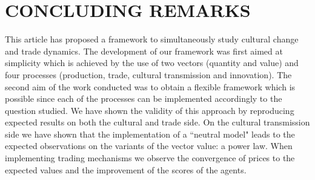 \documentclass{wscpaperproc}
\newcommand{\memo}[2]{\textcolor{#1}{#2}}
\newcommand{\simon}[1]{\memo{green}{Simon: #1\\}}
\begin{document}
%
%

\section{CONCLUDING REMARKS}

This article has proposed a framework to simultaneously study cultural change and trade dynamics. The development of our framework was first aimed at simplicity which is achieved by the use of two vectors (quantity and value) and four processes (production, trade, cultural transmission and innovation). The second aim of the work conducted was to obtain a flexible framework which is possible since each of the processes can be implemented accordingly to the question studied. We have shown the validity of this approach by reproducing expected results on both the cultural and trade side. On the cultural transmission side we have shown that the implementation of a ``neutral model" leads to the expected observations on the variants of the vector value: a power law. When implementing trading mechanisms we observe the convergence of prices to the expected values and the improvement of the scores of the agents.
\end{document}

